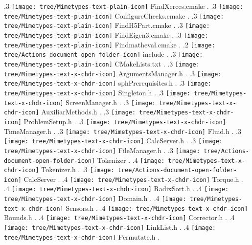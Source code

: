 {.3 { \texttt{[image: tree/Mimetypes-text-plain-icon]} FindXerces.cmake }.
.3 { \texttt{[image: tree/Mimetypes-text-plain-icon]} ConfigureChecks.cmake }.
.3 { \texttt{[image: tree/Mimetypes-text-plain-icon]} FindH5Part.cmake }.
.3 { \texttt{[image: tree/Mimetypes-text-plain-icon]} FindEigen3.cmake }.
.3 { \texttt{[image: tree/Mimetypes-text-plain-icon]} Findmatheval.cmake }.
.2 { \texttt{[image: tree/Actions-document-open-folder-icon]} include }.
.3 { \texttt{[image: tree/Mimetypes-text-plain-icon]} CMakeLists.txt }.
.3 { \texttt{[image: tree/Mimetypes-text-x-chdr-icon]} ArgumentsManager.h }.
.3 { \texttt{[image: tree/Mimetypes-text-x-chdr-icon]} sphPrerequisites.h }.
.3 { \texttt{[image: tree/Mimetypes-text-x-chdr-icon]} Singleton.h }.
.3 { \texttt{[image: tree/Mimetypes-text-x-chdr-icon]} ScreenManager.h }.
.3 { \texttt{[image: tree/Mimetypes-text-x-chdr-icon]} AuxiliarMethods.h }.
.3 { \texttt{[image: tree/Mimetypes-text-x-chdr-icon]} ProblemSetup.h }.
.3 { \texttt{[image: tree/Mimetypes-text-x-chdr-icon]} TimeManager.h }.
.3 { \texttt{[image: tree/Mimetypes-text-x-chdr-icon]} Fluid.h }.
.3 { \texttt{[image: tree/Mimetypes-text-x-chdr-icon]} CalcServer.h }.
.3 { \texttt{[image: tree/Mimetypes-text-x-chdr-icon]} FileManager.h }.
.3 { \texttt{[image: tree/Actions-document-open-folder-icon]} Tokenizer }.
.4 { \texttt{[image: tree/Mimetypes-text-x-chdr-icon]} Tokenizer.h }.
.3 { \texttt{[image: tree/Actions-document-open-folder-icon]} CalcServer }.
.4 { \texttt{[image: tree/Mimetypes-text-x-chdr-icon]} Torque.h }.
.4 { \texttt{[image: tree/Mimetypes-text-x-chdr-icon]} RadixSort.h }.
.4 { \texttt{[image: tree/Mimetypes-text-x-chdr-icon]} Domain.h }.
.4 { \texttt{[image: tree/Mimetypes-text-x-chdr-icon]} Sensors.h }.
.4 { \texttt{[image: tree/Mimetypes-text-x-chdr-icon]} Bounds.h }.
.4 { \texttt{[image: tree/Mimetypes-text-x-chdr-icon]} Corrector.h }.
.4 { \texttt{[image: tree/Mimetypes-text-x-chdr-icon]} LinkList.h }.
.4 { \texttt{[image: tree/Mimetypes-text-x-chdr-icon]} Permutate.h }.
}
